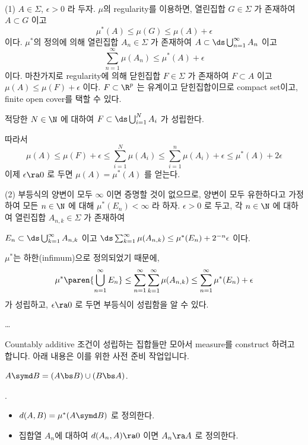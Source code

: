 \pf \\
(1) \(A \in \Sigma\), \(\epsilon > 0\) 라 두자. \(\mu\)의 regularity를 이용하면, 열린집합 \(G \in \Sigma\) 가 존재하여 \(A \subset G\) 이고
\[
    \mu^\ast(A) \leq \mu(G) \leq \mu(A) + \epsilon
\]
이다. \(\mu^\ast\)의 정의에 의해 열린집합 \(A_n \in \Sigma\) 가 존재하여 \(A \subset \ds \bigcup_{n=1}^\infty A_n\) 이고
\[
    \sum_{n=1}^\infty \mu(A_n) \leq \mu^\ast(A) + \epsilon
\]
이다. 마찬가지로 regularity에 의해 닫힌집합 \(F \in \Sigma\) 가 존재하여 \(F\subset A\) 이고 \(\mu(A) \leq \mu(F) + \epsilon\) 이다. \(F \subset \R^p\) 는 유계이고 닫힌집합이므로 compact set이고, finite open cover를 택할 수 있다.
\begin{center}
    적당한 \(N \in \N\) 에 대하여 \(F \subset \ds\bigcup_{i=1}^N A_{i}\) 가 성립한다.
\end{center}
따라서
\[
    \mu(A) \leq \mu(F) + \epsilon \leq \sum_{i=1}^N \mu(A_i) \leq \sum_{i=1}^n \mu(A_i) + \epsilon \leq \mu^\ast(A) + 2\epsilon
\]
이제 \(\epsilon \ra 0\) 로 두면 \(\mu(A) = \mu^\ast(A)\) 를 얻는다.

(2) 부등식의 양변이 모두 \(\infty\) 이면 증명할 것이 없으므로, 양변이 모두 유한하다고 가정하여 모든 \(n\in \N\) 에 대해 \(\mu^\ast(E_n) < \infty\) 라 하자. \(\epsilon > 0\) 로 두고, 각 \(n \in \N\) 에 대하여 열린집합 \(A_{n, k} \in \Sigma\) 가 존재하여
\begin{center}
    \(E_n \subset \ds \bigcup_{k=1}^\infty A_{n, k}\) 이고 \(\ds \sum_{k=1}^\infty \mu(A_{n,k}) \leq \mu^\ast(E_n) + 2^{-n}\epsilon\) 이다.
\end{center}
\(\mu^\ast\)는 하한(infimum)으로 정의되었기 때문에,
\[
    \mu^\ast\paren{\bigcup_{n=1}^\infty E_n} \leq \sum_{n=1}^\infty \sum_{k=1}^\infty \mu(A_{n,k}) \leq \sum_{n=1}^\infty \mu^\ast(E_n) + \epsilon
\]
가 성립하고, \(\epsilon \ra 0\) 로 두면 부등식이 성립함을 알 수 있다.

\dots

Countably additive 조건이 성립하는 집합들만 모아서 measure를 construct 하려고 합니다. 아래 내용은 이를 위한 사전 준비 작업입니다.

\notation {} \(A \symd B = (A\bs B) \cup (B \bs A)\).

.
\begin{itemize}
    \item \(d(A, B) = \mu^\ast(A \symd B)\) 로 정의한다.
    \item 집합열 \(A_n\)에 대하여 \(d(A_n, A) \ra 0\) 이면 \(A_n \ra A\) 로 정의한다.
\end{itemize}

